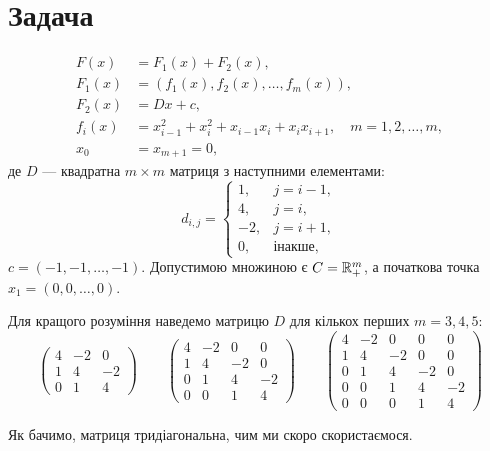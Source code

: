 \section{Задача}

\begin{problem}
    \begin{equation}
        \begin{aligned}
            F(x) &= F_1(x) + F_2(x), \\
            F_1(x) &= (f_1(x), f_2(x), \dots, f_m(x)), \\
            F_2(x) &= D x + c, \\
            f_i(x) &= x_{i - 1}^2 + x_i^2 + x_{i - 1} x_i + x_i x_{i + 1}, \quad m = 1, 2, \dots, m, \\
            x_0 &= x_{m + 1} = 0,
        \end{aligned}
    \end{equation}
    де $D$ --- квадратна $m \times m$ матриця з наступними елементами:
    \begin{equation}
        d_{i,j} = \begin{cases}
             1, & j = i - 1, \\
             4, & j = i, \\
            -2, & j = i + 1, \\
             0, & \text{інакше},
        \end{cases}
    \end{equation}
    $c = (-1, -1, \dots, -1)$. Допустимою множиною є $C = \mathbb{R}_+^m$, а початкова точка $x_1 = (0, 0, \dots, 0)$.
\end{problem}

Для кращого розуміння наведемо матрицю $D$ для кількох перших $m = 3, 4, 5$:
\begin{equation}
    \begin{pmatrix}
        4 & -2 &  0 \\
        1 &  4 & -2 \\
        0 &  1 &  4
    \end{pmatrix}
    \qquad
    \begin{pmatrix}
        4 & -2 &  0 &  0 \\
        1 &  4 & -2 &  0 \\
        0 &  1 &  4 & -2 \\
        0 &  0 &  1 &  4
    \end{pmatrix}
    \qquad
    \begin{pmatrix}
        4 & -2 &  0 &  0 &  0 \\
        1 &  4 & -2 &  0 &  0 \\
        0 &  1 &  4 & -2 &  0 \\
        0 &  0 &  1 &  4 & -2 \\
        0 &  0 &  0 &  1 &  4
    \end{pmatrix}
\end{equation}

\begin{remark}
    Як бачимо, матриця тридіагональна, чим ми скоро скористаємося.
\end{remark}
